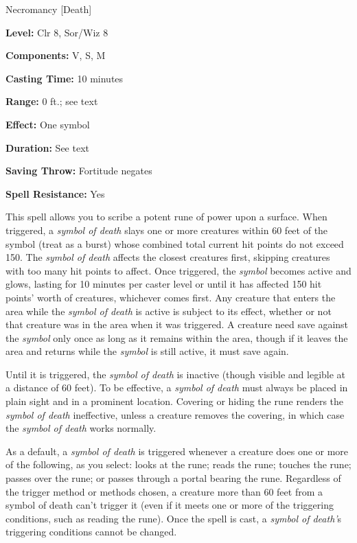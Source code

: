 
Necromancy [Death]

\textbf{Level:} Clr 8, Sor/Wiz 8

\textbf{Components:} V, S, M

\textbf{Casting Time:} 10 minutes

\textbf{Range:} 0 ft.; see text

\textbf{Effect:} One symbol

\textbf{Duration:} See text

\textbf{Saving Throw:} Fortitude negates

\textbf{Spell Resistance:} Yes

This spell allows you to scribe a potent rune of power upon a surface. When triggered, 
a \textit{symbol of death} slays one or more creatures within 60 feet of the symbol 
(treat as a burst) whose combined total current hit points do not exceed 150. The 
\textit{symbol of death} affects the closest creatures first, skipping creatures 
with too many hit points to affect. Once triggered, the \textit{symbol} becomes 
active and glows, lasting for 10 minutes per caster level or until it has affected 
150 hit points' worth of creatures, whichever comes first. Any creature that enters 
the area while the \textit{symbol of death} is active is subject to its effect, 
whether or not that creature was in the area when it was triggered. A creature 
need save against the \textit{symbol} only once as long as it remains within the 
area, though if it leaves the area and returns while the \textit{symbol} is still 
active, it must save again.

Until it is triggered, the \textit{symbol of death} is inactive (though visible 
and legible at a distance of 60 feet). To be effective, a \textit{symbol of death 
}must always be placed in plain sight and in a prominent location. Covering or 
hiding the rune renders the \textit{symbol of death} ineffective, unless a creature 
removes the covering, in which case the \textit{symbol of death} works normally.

As a default, a \textit{symbol of death} is triggered whenever a creature does 
one or more of the following, as you select: looks at the rune; reads the rune; 
touches the rune; passes over the rune; or passes through a portal bearing the 
rune. Regardless of the trigger method or methods chosen, a creature more than 
60 feet from a symbol of death can't trigger it (even if it meets one or more of 
the triggering conditions, such as reading the rune). Once the spell is cast, a 
\textit{symbol of death'}s triggering conditions cannot be changed.

